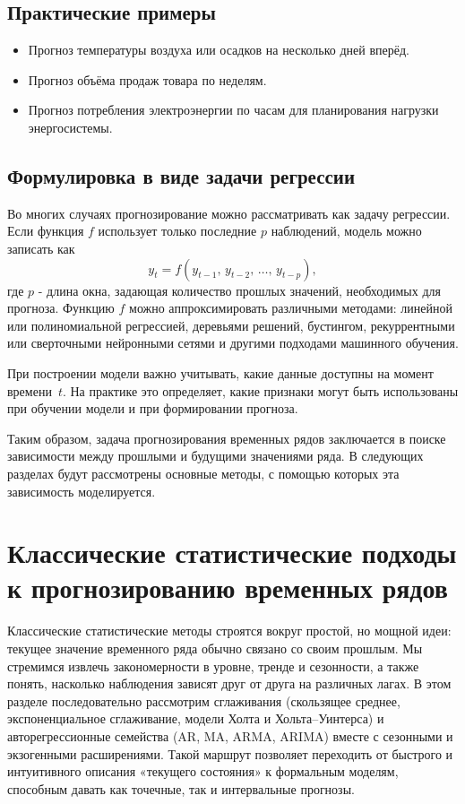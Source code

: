 \documentclass[12pt,a4paper]{article}
\begin{document}
\subsection{Практические примеры}
\begin{itemize}
    \item Прогноз температуры воздуха или осадков на несколько дней вперёд.
    \item Прогноз объёма продаж товара по неделям.
    \item Прогноз потребления электроэнергии по часам для планирования нагрузки энергосистемы.
\end{itemize}

\subsection{Формулировка в виде задачи регрессии}
Во многих случаях прогнозирование можно рассматривать как задачу регрессии.
Если функция $f$ использует только последние $p$ наблюдений, модель можно записать как
\[
y_t = f(y_{t-1},\,y_{t-2},\,\ldots,\,y_{t-p}),
\]
где $p$ - длина окна, задающая количество прошлых значений, необходимых для прогноза.
Функцию $f$ можно аппроксимировать различными методами: линейной или полиномиальной регрессией, деревьями решений, бустингом, рекуррентными или сверточными нейронными сетями и другими подходами машинного обучения.

При построении модели важно учитывать, какие данные доступны на момент времени~$t$. На практике это определяет, какие признаки могут быть использованы при обучении модели и при формировании прогноза.

\bigskip
Таким образом, задача прогнозирования временных рядов заключается в поиске зависимости между прошлыми и будущими значениями ряда. В следующих разделах будут рассмотрены основные методы, с помощью которых эта зависимость моделируется.





\section{Классические статистические подходы к прогнозированию временных рядов}

Классические статистические методы строятся вокруг простой, но мощной идеи: текущее значение временного ряда обычно связано со своим прошлым. Мы стремимся извлечь закономерности в уровне, тренде и сезонности, а также понять, насколько наблюдения зависят друг от друга на различных лагах. В этом разделе последовательно рассмотрим сглаживания (скользящее среднее, экспоненциальное сглаживание, модели Холта и Хольта–Уинтерса) и авторегрессионные семейства (AR, MA, ARMA, ARIMA) вместе с сезонными и экзогенными расширениями. Такой маршрут позволяет переходить от быстрого и интуитивного описания «текущего состояния» к формальным моделям, способным давать как точечные, так и интервальные прогнозы.
\end{document}
